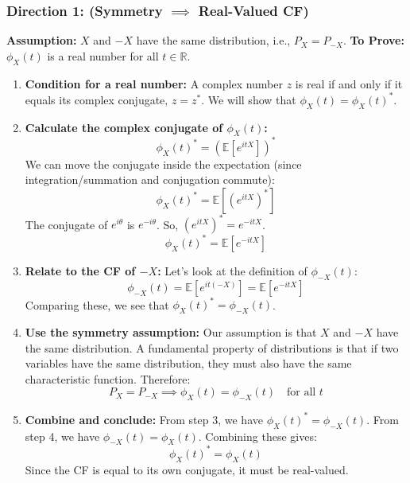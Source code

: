 \documentclass[11pt,a4paper]{article}
\begin{document}
\subsubsection{Direction 1: (Symmetry $\implies$ Real-Valued CF)}
\textbf{Assumption:} $X$ and $-X$ have the same distribution, i.e., $P_X = P_{-X}$.
\textbf{To Prove:} $\phi_X(t)$ is a real number for all $t \in \mathbb{R}$.
\begin{enumerate}
    \item \textbf{Condition for a real number:} A complex number $z$ is real if and only if it equals its complex conjugate, $z = z^*$. We will show that $\phi_X(t) = \phi_X(t)^*$.
    \item \textbf{Calculate the complex conjugate of $\phi_X(t)$:}
    \[ \phi_X(t)^* = (\mathbb{E}[e^{itX}])^* \]
    We can move the conjugate inside the expectation (since integration/summation and conjugation commute):
    \[ \phi_X(t)^* = \mathbb{E}[(e^{itX})^*] \]
    The conjugate of $e^{i\theta}$ is $e^{-i\theta}$. So, $(e^{itX})^* = e^{-itX}$.
    \[ \phi_X(t)^* = \mathbb{E}[e^{-itX}] \]
    \item \textbf{Relate to the CF of $-X$:} Let's look at the definition of $\phi_{-X}(t)$:
    \[ \phi_{-X}(t) = \mathbb{E}[e^{it(-X)}] = \mathbb{E}[e^{-itX}] \]
    Comparing these, we see that $\phi_X(t)^* = \phi_{-X}(t)$.
    \item \textbf{Use the symmetry assumption:} Our assumption is that $X$ and $-X$ have the same distribution. A fundamental property of distributions is that if two variables have the same distribution, they must also have the same characteristic function. Therefore:
    \[ P_X = P_{-X} \implies \phi_X(t) = \phi_{-X}(t) \quad \text{for all } t \]
    \item \textbf{Combine and conclude:} From step 3, we have $\phi_X(t)^* = \phi_{-X}(t)$. From step 4, we have $\phi_{-X}(t) = \phi_X(t)$. Combining these gives:
    \[ \phi_X(t)^* = \phi_X(t) \]
    Since the CF is equal to its own conjugate, it must be real-valued.
\end{enumerate}
\end{document}
